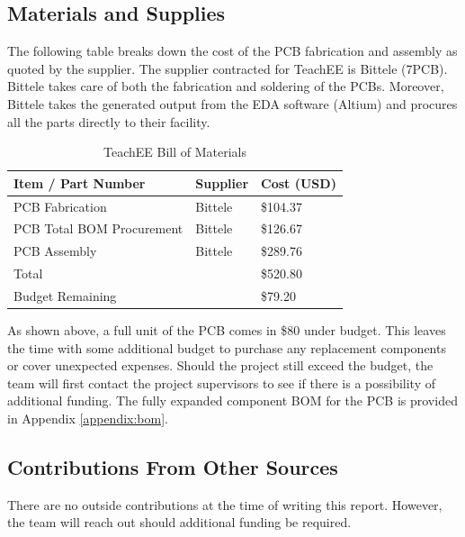 \documentclass[letterpaper,12pt]{article}
\begin{document}
\subsection{Materials and Supplies}
The following table breaks down the cost of the PCB fabrication and assembly as
quoted by the supplier. The supplier contracted for TeachEE is Bittele (7PCB).
Bittele takes care of both the fabrication and soldering of the PCBs. Moreover,
Bittele takes the generated output from the EDA software (Altium) and procures
all the parts directly to their facility.

\begin{table}[h!]
    \caption{TeachEE Bill of Materials}
    \begin{tabularx}{\textwidth}{l|l|l}
        \textbf{Item / Part Number} & \textbf{Supplier} & \textbf{Cost (USD)} \\
        \hline
        PCB Fabrication & Bittele & \$104.37\\
        PCB Total BOM Procurement & Bittele & \$126.67\\
        PCB Assembly & Bittele & \$289.76\\
        \hline
        Total & & \$520.80\\
        \hline
        Budget Remaining & & \$79.20
    \end{tabularx} 
\label{tab:abbreviated-bom}
\end{table}

\noindent
As shown above, a full unit of the PCB comes in \$80 under budget. This leaves
the time with some additional budget to purchase any replacement components or
cover unexpected expenses. Should the project still exceed the budget, the team
will first contact the project supervisors to see if there is a possibility of
additional funding. The fully expanded component BOM for the PCB is provided in
Appendix \ref{appendix:bom}.

\subsection{Contributions From Other Sources}
There are no outside contributions at the time of writing this report. However,
the team will reach out should additional funding be required. 
\end{document}
